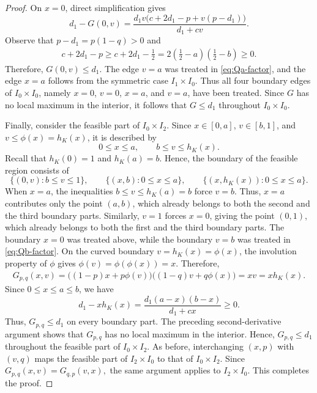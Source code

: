 \documentclass[10pt,a4paper]{amsart}
\begin{document}
\begin{proof}
On $x=0$, direct simplification gives
\begin{equation*}
 d_1-G(0,v)
 =
 \frac{d_1v
 \bigl(c+2d_1-p+v(p-d_1)\bigr)}
 {d_1+cv}.
\end{equation*}
Observe that
$
 p-d_1=p(1-q)>0
$
and
\begin{align*}
 c+2d_1-p
 \geq
 c+2d_1-\frac12=
 2\left(\frac12-a\right)
  \left(\frac12-b\right)
 \geq0.
\end{align*}
Therefore, $G(0,v)\leq d_1$. 
The edge $v=a$ was treated in \eqref{eq:Qa-factor}, and the edge
$x=a$ follows from the symmetric case $I_1\times I_0$. Thus all four
boundary edges of $I_0\times I_0$, namely $x=0$, $v=0$, $x=a$, and
$v=a$, have been treated. Since $G$ has no local maximum in the
interior, it follows that $G\leq d_1$ throughout
$I_0\times I_0$.






Finally, consider the feasible part of $I_0\times I_2$. Since
$x\in[0,a]$, $v\in[b,1]$, and $v\leq\phi(x)=h_K(x)$, it is described
by
\begin{equation*}
 0\leq x\leq a,
 \qquad
 b\leq v\leq h_K(x).
\end{equation*}
Recall that $h_K(0)=1$ and $h_K(a)=b$. Hence, the boundary of the
feasible region consists of
\begin{equation*}
 \{(0,v):b\leq v\leq1\},
 \qquad
 \{(x,b):0\leq x\leq a\},
 \qquad
 \{(x,h_K(x)):0\leq x\leq a\}.
\end{equation*}
When $x=a$, the inequalities
$
 b\leq v\leq h_K(a)=b
$
force $v=b$. Thus, $x=a$ contributes only the point $(a,b)$, which
already belongs to both the second and the third boundary parts.
Similarly, $v=1$ forces $x=0$, giving the point $(0,1)$, which already belongs to both the first and the third boundary parts.
The boundary $x=0$ was treated above, while the boundary $v=b$ was
treated in \eqref{eq:Qb-factor}. On the curved boundary
$v=h_K(x)=\phi(x)$, the involution property of $\phi$ gives
$
 \phi(v)=\phi(\phi(x))=x.
$
Therefore,
\begin{align*}
 G_{p,q}(x,v)
 =
 \bigl((1-p)x+p\phi(v)\bigr)
 \bigl((1-q)v+q\phi(x)\bigr)=xv=xh_K(x).
\end{align*}
Since $0\leq x\leq a\leq b$, we have
\begin{equation*}
 d_1-xh_K(x)
 =
 \frac{d_1(a-x)(b-x)}{d_1+cx}
 \geq0.
\end{equation*}
Thus, $G_{p,q}\leq d_1$ on every boundary part. The preceding
second-derivative argument shows that $G_{p,q}$ has no local maximum
in the interior. Hence, $G_{p,q}\leq d_1$ throughout the feasible part
of $I_0\times I_2$. As before, interchanging $(x,p)$ with $(v,q)$ maps the feasible part
of $I_2\times I_0$ to that of $I_0\times I_2$. Since
$
 G_{p,q}(x,v)=G_{q,p}(v,x),
$
the same argument applies to $I_2\times I_0$.
This completes the proof.
\end{proof}
\end{document}
